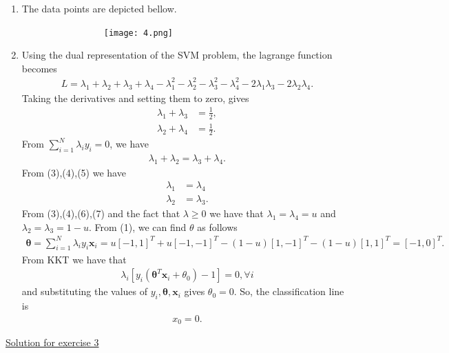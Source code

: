 \documentclass[12pt]{book}
\begin{document}
\begin{enumerate}[label=(\alph*)]
	\item The data points are depicted bellow.
	
	\ \ \ \ \ \ \ \ \ \ \ \ \ \ \ \ \ \texttt{[image: 4.png]}
	\item Using the dual representation of the SVM problem, the lagrange function becomes 
	\begin{align*}
	L = \lambda_1 + \lambda_2 + \lambda_3 + \lambda_4 - \lambda_1^2 - \lambda_2^2 - \lambda_3^2 - \lambda_4^2 - 2\lambda_1\lambda_3 - 2 \lambda_2\lambda_4.
	\end{align*}
	Taking the derivatives and setting them to zero, gives
	\begin{align}
	\lambda_1+\lambda_3&=\frac{1}{2}, \\
	\lambda_2 + \lambda_4 &= \frac{1}{2}.
	\end{align}
	From $\sum_{i=1}^{N}\lambda_i y_i= 0$, we have
	\begin{align}
	\lambda_1 + \lambda_2 = \lambda_3 + \lambda_4.
	\end{align}
	From (3),(4),(5) we have
	\begin{align}
	\lambda_1 &= \lambda_4 \\
	\lambda_2 &= \lambda_3.
	\end{align}
	From (3),(4),(6),(7) and the fact that $\lambda\ge0$ we have that $\lambda_1=\lambda_4=u$ and $\lambda_2=\lambda_3=1-u$. From (1), we can find $\theta$ as follows
	\begin{align*}
	\pmb{\theta} = \sum_{i=1}^{N}\lambda_i y_i \pmb{x}_i = u[-1,1]^T + u[-1,-1]^T - (1-u)[1,-1]^T - (1-u)[1,1]^T = [-1,0]^T.
	\end{align*}
	From KKT we have that
	\begin{align*}
	\lambda_i \left[  y_i(\pmb{\theta}^T\pmb{x}_i + \theta_0) -1 \right] = 0, \forall i 
	\end{align*}
	and substituting the values of $y_i,\pmb{\theta},\pmb{x}_i$ gives $\theta_0=0$. So, the classification line is
	\begin{align*}
	x_0 = 0.
	\end{align*}
\end{enumerate}

\vspace{0.3 cm}
{\underline{\large Solution for exercise 3}}
\vspace{0.3 cm}
\end{document}
